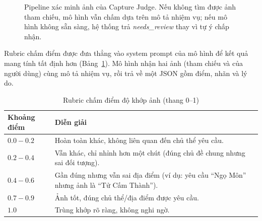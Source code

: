 \begin{figure}[H]
\centering
{}
\caption{Pipeline xác minh ảnh của Capture Judge. Nếu không tìm được ảnh tham chiếu, mô hình vẫn chấm dựa trên mô tả nhiệm vụ; nếu mô hình không sẵn sàng, hệ thống trả \textit{needs\_review} thay vì tự ý chấp nhận.}
\label{fig:impl_capture}
\end{figure}

Rubric chấm điểm được đưa thẳng vào system prompt của mô hình để kết quả
mang tính tất định hơn (Bảng~\ref{tab:impl_rubric}). Mô hình nhận hai
ảnh (tham chiếu và của người dùng) cùng mô tả nhiệm vụ, rồi trả về một
JSON gồm điểm, nhãn và lý do.

\begin{table}[H]
\centering
\caption{Rubric chấm điểm độ khớp ảnh (thang 0--1)}
\label{tab:impl_rubric}
\begin{tabularx}{\textwidth}{>{\raggedright\arraybackslash}p{2.2cm} X}
\toprule
\textbf{Khoảng điểm} & \textbf{Diễn giải} \\
\midrule
$0.0 - 0.2$ & Hoàn toàn khác, không liên quan đến chủ thể yêu cầu. \\
$0.2 - 0.4$ & Vẫn khác, chỉ nhỉnh hơn một chút (đúng chủ đề chung nhưng sai đối tượng). \\
$0.4 - 0.6$ & Gần đúng nhưng vẫn sai địa điểm (ví dụ: yêu cầu ``Ngọ Môn'' nhưng ảnh là ``Tử Cấm Thành''). \\
$0.7 - 0.9$ & Ảnh tốt, đúng chủ thể/địa điểm được yêu cầu. \\
$1.0$ & Trùng khớp rõ ràng, không nghi ngờ. \\
\bottomrule
\end{tabularx}
\end{table}

